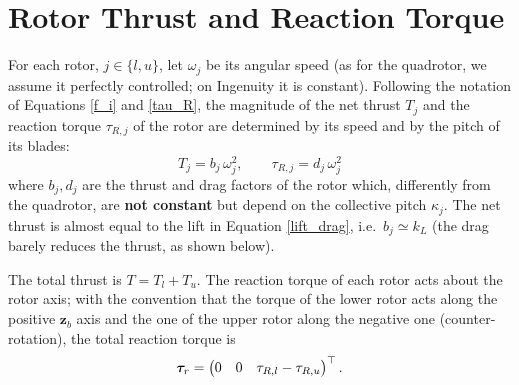 \documentclass[10pt, a4paper]{report}
\begin{document}
\section{Rotor Thrust and Reaction Torque}
For each rotor, $j\in\{l,u\}$, let $\omega_j$ be its angular speed (as for the quadrotor, we assume it perfectly controlled; on Ingenuity it is constant). Following the notation of Equations \eqref{f_i} and \eqref{tau_R}, the magnitude of the net thrust $T_j$ and the reaction torque $\tau_{R,j}$ of the rotor are determined by its speed and by the pitch of its blades:\begin{equation}\label{ing_thrust}
    T_j=b_j\,\omega_j^2,\qquad \tau_{R,j}=d_j\,\omega_j^2
\end{equation}
where $b_j,d_j$ are the thrust and drag factors of the rotor which, differently from the quadrotor, are \textbf{not constant} but depend on the collective pitch $\kappa_j$. The net thrust is almost equal to the lift in Equation \eqref{lift_drag}, i.e.\ $b_j\simeq k_L$ (the drag barely reduces the thrust, as shown below).

The total thrust is $T=T_l+T_u$. The reaction torque of each rotor acts about the rotor axis; with the convention that the torque of the lower rotor acts along the positive $\mathbf z_b$ axis and the one of the upper rotor along the negative one (counter-rotation), the total reaction torque is\begin{equation}
    {\boldsymbol{\tau}}_r=\begin{pmatrix}0&0&\tau_{R,l}-\tau_{R,u}\end{pmatrix}^\top.
\end{equation}
\end{document}
